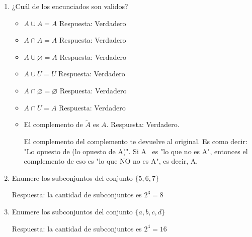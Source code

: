 \begin{ejercicio}
\begin{enumerate}
\begin{itemize}
        \item \(S_3 \cup S_1 \cup S_4 \text{ Respuesta: } \{2,4,6\}\)
    \end{itemize}
   \item ¿Cuál de los encunciados son validos?
    \begin{itemize}
        \item \(A\cup A = A\)  Respuesta: Verdadero
        \item \(A \cap A = A\)  Respuesta: Verdadero
        \item \(A \cup \varnothing = A\)  Respuesta: Verdadero
        \item \(A \cup U = U\)  Respuesta: Verdadero
        \item \(A \cap \varnothing = \varnothing\)  Respuesta: Verdadero
        \item \(A \cap U = A\)  Respuesta: Verdadero
        \item El complemento de \(\tilde{A}\) es \(A\).  Respuesta: Verdadero. 
        
        El complemento del complemento te devuelve al original. Es como decir: "Lo opuesto de (lo opuesto de A)". Si A~ es "lo que no es A", entonces el complemento de eso es "lo que NO no es A", es decir, A.
    \end{itemize}
   \item Enumere los subconjuntos del conjunto \(\{5,6,7\}\)
   
   Respuesta: la cantidad de subconjuntos es \(2^3 = 8\)
   \item Enumere los subconjuntos del conjunto \(\{a,b,c,d\}\)
   
   Respuesta: la cantidad de subconjuntos es \(2^4 = 16\)
\end{enumerate}
\end{ejercicio}



